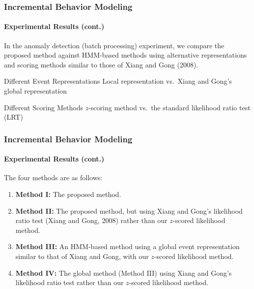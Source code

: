 \begin{frame}
    \frametitle{Incremental Behavior Modeling}
    \framesubtitle{Experimental Results (cont.)}

    In the anomaly detection (batch processing) experiment, we compare 
    the proposed method against HMM-based methods using alternative 
    representations and scoring methods similar to those of Xiang and 
    Gong (2008).

    \medskip

    \begin{block}{Different Event Representations}
        Local representation vs.\ Xiang and Gong's global 
        representation
    \end{block}
    
    \begin{block}{Different Scoring Methods}
        $z$-scoring method vs.\ the standard likelihood ratio 
        test (LRT)
    \end{block}


\end{frame}


\begin{frame}
    \frametitle{Incremental Behavior Modeling}
    \framesubtitle{Experimental Results (cont.)}
    
    The four methods are as follows:
    \begin{enumerate}
        \item {\bf Method I:} The proposed method.
        \item {\bf Method II:} The proposed method, but using Xiang and Gong's
            likelihood ratio test (Xiang and Gong, 2008)
            rather than our $z$-scored likelihood method.
        \item {\bf Method III:} An HMM-based method using a global event
            representation similar to that of Xiang and Gong, with our
            $z$-scored likelihood method.
        \item {\bf Method IV:} The global method (Method III) using Xiang and
            Gong's likelihood ratio test rather than our $z$-scored likelihood
            method.
    \end{enumerate}

\end{frame}


